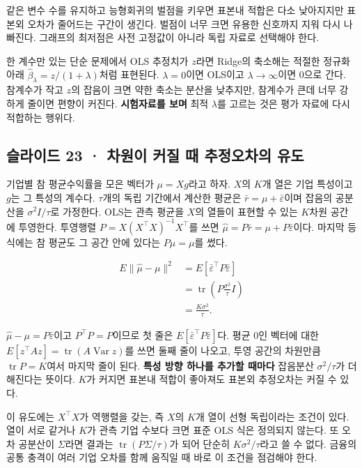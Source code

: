 \documentclass[11pt,a4paper]{article}
\begin{document}
같은 변수 수를 유지하고 능형회귀의 벌점을 키우면 표본내 적합은 다소 낮아지지만 표본외 오차가 줄어드는 구간이 생긴다. 벌점이 너무 크면 유용한 신호까지 지워 다시 나빠진다. 그래프의 최저점은 사전 고정값이 아니라 독립 자료로 선택해야 한다.\par

한 계수만 있는 단순 문제에서 OLS 추정치가 $z$라면 Ridge의 축소해는 적절한 정규화 아래 $\hat\beta_{\lambda}=z/(1+\lambda)$처럼 표현된다. $\lambda=0$이면 OLS이고 $\lambda\to\infty$이면 0으로 간다. 참계수가 작고 $z$의 잡음이 크면 약한 축소는 분산을 낮추지만, 참계수가 큰데 너무 강하게 줄이면 편향이 커진다. \textbf{시험자료를 보며} 최적 $\lambda$를 고르는 것은 평가 자료에 다시 적합하는 행위다.\par

\subsection{슬라이드 23 · 차원이 커질 때 추정오차의 유도}
기업별 참 평균수익률을 모은 벡터가 $\mu=Xg$라고 하자. $X$의 $K$개 열은 기업 특성이고 $g$는 그 특성의 계수다. $\tau$개의 독립 기간에서 계산한 평균은 $\bar r=\mu+\bar\varepsilon$이며 잡음의 공분산을 $\sigma^2I/\tau$로 가정한다. OLS는 관측 평균을 $X$의 열들이 표현할 수 있는 $K$차원 공간에 투영한다. 투영행렬 $P=X(X^\top X)^{-1}X^\top$를 쓰면 $\hat\mu=P\bar r=\mu+P\bar\varepsilon$이다. 마지막 등식에는 참 평균도 그 공간 안에 있다는 $P\mu=\mu$를 썼다.\par

\[
\begin{aligned}
E\|\hat\mu-\mu\|^2
&=E[\bar\varepsilon^\top P\bar\varepsilon]\\
&=\operatorname{tr}\!\left(P\frac{\sigma^2}{\tau}I\right)\\
&=\frac{K\sigma^2}{\tau}.
\end{aligned}
\]

$\hat\mu-\mu=P\bar\varepsilon$이고 $P^\top P=P$이므로 첫 줄은 $E[\bar\varepsilon^\top P\bar\varepsilon]$다. 평균 0인 벡터에 대한 $E[z^\top Az]=\operatorname{tr}(A\operatorname{Var}z)$를 쓰면 둘째 줄이 나오고, 투영 공간의 차원만큼 $\operatorname{tr}P=K$여서 마지막 줄이 된다. \textbf{특성 방향 하나를 추가할 때마다} 잡음분산 $\sigma^2/\tau$가 더해진다는 뜻이다. $K$가 커지면 표본내 적합이 좋아져도 표본외 추정오차는 커질 수 있다.\par

이 유도에는 $X^\top X$가 역행렬을 갖는, 즉 $X$의 $K$개 열이 선형 독립이라는 조건이 있다. 열이 서로 같거나 $K$가 관측 기업 수보다 크면 표준 OLS 식은 정의되지 않는다. 또 오차 공분산이 $\Sigma$라면 결과는 $\operatorname{tr}(P\Sigma/\tau)$가 되어 단순히 $K\sigma^2/\tau$라고 쓸 수 없다. 금융의 공통 충격이 여러 기업 오차를 함께 움직일 때 바로 이 조건을 점검해야 한다.\par
\end{document}

